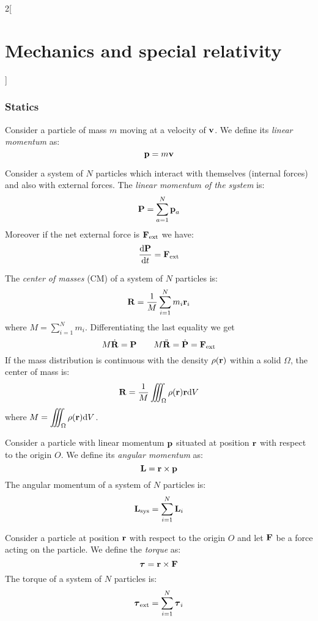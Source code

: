 \documentclass[../../../main.tex]{subfiles}
\begin{document}
\begin{multicols}{2}[\section{Mechanics and special relativity}]
  \subsubsection{Statics}
  \begin{definition}
    Consider a particle of mass $m$ moving at a velocity of $\boldsymbol{\mathrm{v}}$. We define its \textit{linear momentum} as:
    $$\boldsymbol{\mathrm{p}}=m\boldsymbol{\mathrm{v}}$$
  \end{definition}
  \begin{prop}
    Consider a system of $N$ particles which interact with themselves (internal forces) and also with external forces. The \textit{linear momentum of the system} is: $$\boldsymbol{\mathrm{P}}=\sum_{a=1}^N\boldsymbol{\mathrm{p}}_a$$ Moreover if the net external force is $\boldsymbol{\mathrm{F}}_\text{ext}$ we have:
    $$\dv{\boldsymbol{\mathrm{P}}}{t}=\boldsymbol{\mathrm{F}}_\text{ext}$$
  \end{prop}
  \begin{prop}
    The \textit{center of masses} (CM) of a system of $N$ particles is: $$\boldsymbol{\mathrm{R}}=\frac{1}{M}\sum_{i=1}^Nm_i\boldsymbol{\mathrm{r}}_i$$ where $\displaystyle M=\sum_{i=1}^Nm_i$. Differentiating the last equality we get
    $$M\dot{\boldsymbol{\mathrm{R}}}=\boldsymbol{\mathrm{P}}\qquad M\ddot{\boldsymbol{\mathrm{R}}}=\dot{\boldsymbol{\mathrm{P}}}=\boldsymbol{\mathrm{F}}_\text{ext}$$
    If the mass distribution is continuous with the density $\rho(\boldsymbol{\mathrm{r}})$ within a solid $\Omega$, the center of mass is: $$\boldsymbol{\mathrm{R}}=\frac{1}{M}\iiint_\Omega\rho(\boldsymbol{\mathrm{r}})\boldsymbol{\mathrm{r}}\dd V$$ where $\displaystyle M=\iiint_\Omega\rho(\boldsymbol{\mathrm{r}})\dd V$.
  \end{prop}
  \begin{prop}
    Consider a particle with linear momentum $\boldsymbol{\mathrm{p}}$ situated at position $\boldsymbol{\mathrm{r}}$ with respect to the origin $O$. We define its \textit{angular momentum} as: $$\boldsymbol{\mathrm{L}}=\boldsymbol{\mathrm{r}}\times\boldsymbol{\mathrm{p}}$$ The angular momentum of a system of $N$ particles is: $$\boldsymbol{\mathrm{L}}_\text{sys}=\sum_{i=1}^N\boldsymbol{\mathrm{L}}_i$$
  \end{prop}
  \begin{prop}[Torque]
    Consider a particle at position $\boldsymbol{\mathrm{r}}$ with respect to the origin $O$ and let $\boldsymbol{\mathrm{F}}$ be a force acting on the particle. We define the \textit{torque} as: $$\vb*{\tau}=\boldsymbol{\mathrm{r}}\times\boldsymbol{\mathrm{F}}$$ The torque of a system of $N$ particles is: $$\vb*{\tau}_\text{ext}=\sum_{i=1}^N\vb*{\tau}_i$$

\end{prop}
\end{multicols}
\end{document}
